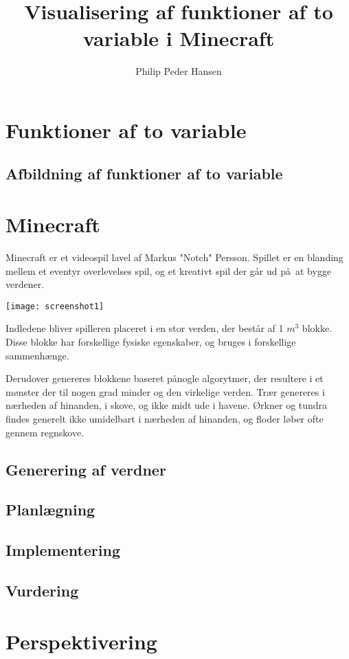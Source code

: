 \documentclass[a4paper,12pt]{report}
\author{Philip Peder Hansen}
\title{Visualisering af funktioner af to variable i Minecraft}
\begin{document}
	\maketitle
	\tableofcontents
	\clearpage
	\section{Funktioner af to variable}
	\subsection{Afbildning af funktioner af to variable}
	\section{Minecraft}
		Minecraft er et videospil lavel af Markus "Notch" Persson.
		Spillet er en blanding mellem et eventyr overlevelses spil, og et kreativt spil der g\aa r ud p\aa \ at bygge verdener.

		\vspace{5 mm}
		\texttt{[image: screenshot1]}
		\vspace{5 mm}

		Indledene bliver spilleren placeret i en stor verden, der best\aa r af 1 $m^3$ blokke. Disse blokke har forskellige fysiske egenskaber,
		og bruges i forskellige sammenh\ae nge.

		Derudover genereres blokkene baseret p\aa  nogle algorytmer, der resultere i et m\o nster der til nogen grad minder
		og den virkelige verden. Tr\ae r genereres i n\ae rheden af hinanden, i skove, og ikke midt ude i havene.
		\O rkner og tundra findes generelt ikke umidelbart i n\ae rheden af hinanden, og floder l\o ber ofte gennem regnskove. 
	\subsection{Generering af verdner}
	\subsection{Planlægning}
	\subsection{Implementering}
	\subsection{Vurdering}
	\section{Perspektivering}
\end{document}
